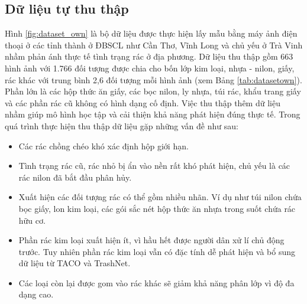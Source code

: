 \documentclass[../the.tex]{subfiles}
\begin{document}
\subsection{Dữ liệu tự thu thập}
\label{sec:own}
{\fontsize{13}{12} \selectfont

	Hình \ref{fig:dataset_own} là bộ dữ liệu được thực hiện lấy mẫu bằng máy ảnh điện thoại ở các tỉnh thành ở ĐBSCL như Cần Thơ, Vĩnh Long và chủ yếu ở Trà Vinh nhầm phản ánh thực tế tình trạng rác ở địa phương.
	Dữ liệu thu thập gồm 663 hình ảnh với 1.766 đối tượng được chia cho bốn lớp kim loại, nhựa - nilon, giấy, rác khác với trung bình 2,6 đối tượng mỗi hình ảnh (xem Bảng \ref{tab:datasetown}).
	Phần lớn là các hộp thức ăn giấy, các bọc nilon, ly nhựa, túi rác, khẩu trang giấy và các phần rác cũ không có hình dạng cố định.
	Việc thu thập thêm dữ liệu nhầm giúp mô hình học tập và cải thiện khả năng phát hiện đúng thực tế. Trong quá trình thực hiện thu thập dữ liệu gặp những vấn đề như sau:

	\begin{itemize}
		\item Các rác chồng chéo khó xác định hộp giới hạn.
		\item Tình trạng rác cũ, rác nhỏ bị ẩn vào nền rất khó phát hiện, chủ yếu là các rác nilon đã bắt đầu phân hủy.
		\item Xuất hiện các đối tượng rác có thể gồm nhiều nhãn. Ví dụ như túi nilon chứa bọc giấy, lon kim loại, các gói sắc nét hộp thức ăn nhựa trong suốt chứa rác hữu cơ.
		\item Phần rác kim loại xuất hiện ít, vì hầu hết được người dân xử lí chủ động trước. Tuy nhiên phần rác kim loại vẫn có đặc tính dễ phát hiện và bổ sung dữ liệu từ TACO \cite{proença2020taco} và TrashNet.
		\item Các loại còn lại được gom vào rác khác sẽ giảm khả năng phân lớp vì độ đa dạng cao.
	\end{itemize}

}
\end{document}
